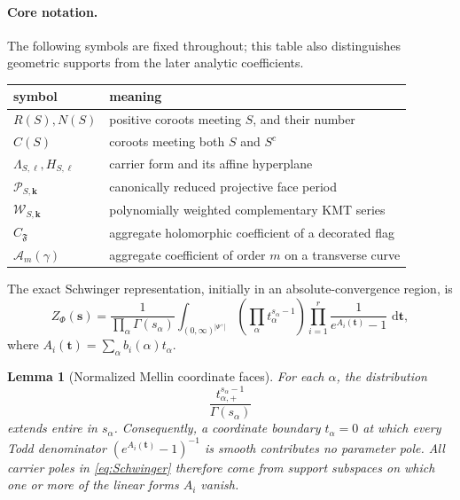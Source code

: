 \documentclass[11pt]{article}
\newtheorem{lemma}[theorem]{Lemma}
\newcommand{\dd}{\,\mathrm d}
\newcommand{\cP}{\mathcal P}
\newcommand{\cW}{\mathcal W}
\newcommand{\cA}{\mathcal A}
\begin{document}
\paragraph{Core notation.}
The following symbols are fixed throughout; this table also distinguishes
geometric supports from the later analytic coefficients.
\begin{center}
\small
\begin{tabularx}{\textwidth}{@{}l X@{}}
\toprule
symbol & meaning\\
\midrule
\(R(S),N(S)\) & positive coroots meeting \(S\), and their number\\
\(C(S)\) & coroots meeting both \(S\) and \(S^c\)\\
\(\Lambda_{S,\ell},H_{S,\ell}\) & carrier form and its affine hyperplane\\
\(\cP_{S,\mathbf k}\) & canonically reduced projective face period\\
\(\cW_{S,\mathbf k}\) & polynomially weighted complementary KMT series\\
\(C_{\mathfrak F}\) & aggregate holomorphic coefficient of a decorated flag\\
\(\cA_m(\gamma)\) & aggregate coefficient of order \(m\) on a transverse curve\\
\bottomrule
\end{tabularx}
\end{center}

The exact Schwinger representation, initially in an absolute-convergence
region, is
\begin{equation}\label{eq:Schwinger}
 Z_\Phi(\mathbf s)
 =\frac1{\prod_{\alpha}\Gamma(s_\alpha)}
 \int_{(0,\infty)^{|\Psi^+|}}
 \left(\prod_\alpha t_\alpha^{s_\alpha-1}\right)
 \prod_{i=1}^r\frac{1}{e^{A_i(\mathbf t)}-1}\,\dd\mathbf t,
\end{equation}
where $A_i(\mathbf t)=\sum_\alpha b_i(\alpha)t_\alpha$.

\begin{lemma}[Normalized Mellin coordinate faces]
\label{lem:normalized-mellin}
For each \(\alpha\), the distribution
\[
 \frac{t_{\alpha,+}^{s_\alpha-1}}{\Gamma(s_\alpha)}
\]
extends entire in \(s_\alpha\).  Consequently, a coordinate boundary
\(t_\alpha=0\) at which every Todd denominator
\((e^{A_i(\mathbf t)}-1)^{-1}\) is smooth contributes no parameter pole.
All carrier poles in \eqref{eq:Schwinger} therefore come from support
subspaces on which one or more of the linear forms \(A_i\) vanish.
\end{lemma}
\end{document}
